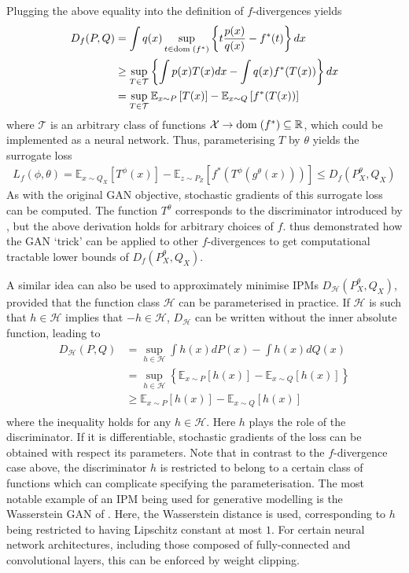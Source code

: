 Plugging the above equality into the definition of $f$-divergences yields
%
\begin{align*}
D_f(P, Q) &= \int q(x) \sup_{t \in {\bf{\rm dom}}\;(f^*)} \left\{t \frac{p(x)}{q(x)} - f^*(t) \right\} dx \\
& \geq \sup_{T \in \mathcal{T}} \left\{ \int p(x) T(x) dx - \int q(x) f^*(T(x)) \right\} dx \\
&= \sup_{T \in \mathcal{T}} \mathbb{E}_{x \sim P} \left[ T(x) \right] - \mathbb{E}_{x \sim Q} \left[ f^*(T(x)) \right] 
\end{align*}
%
where $\mathcal{T}$ is an arbitrary class of functions $\mathcal{X} \to {\bf{\rm dom}}\;(f^*) \subseteq \mathbb{R}$, which could be implemented as a neural network.
Thus, parameterising $T$ by $\theta$ yields the surrogate loss
%
\begin{align*}
L_f(\phi, \theta) = \mathbb{E}_{x \sim Q_X} \left[ T^\phi(x) \right] - \mathbb{E}_{z \sim P_Z} \left[ f^*(T^\phi(g^\theta(x))) \right] \leq D_f(P^\theta_X, Q_X)
\end{align*}
%
As with the original GAN objective, stochastic gradients of this surrogate loss can be computed. 
The function $T^\theta$ corresponds to the discriminator introduced by \cite{goodfellow}, but the above derivation holds for arbitrary choices of $f$. 
\cite{nowozin et al} thus demonstrated how the GAN `trick' can be applied to other $f$-divergences to get computational tractable lower bounds of $D_f(P^\theta_X, Q_X)$.

A similar idea can also be used to approximately minimise IPMs $D_\mathcal{H}(P^\theta_X, Q_X)$, provided that the function class $\mathcal{H}$ can be parameterised in practice.
If $\mathcal{H}$ is such that $h \in \mathcal{H}$ implies that $-h \in \mathcal{H}$, $D_\mathcal{H}$ can be written without the inner absolute function, leading to
%
\begin{align*}
D_{\mathcal{H}}(P, Q) &= \sup_{h\in\mathcal{H}} \int h(x) dP(x) - \int h(x) dQ(x) \\
&= \sup_{h\in\mathcal{H}} \left\{ \mathbb{E}_{x \sim P} \left[ h(x) \right]- \mathbb{E}_{x \sim Q} \left[ h(x) \right] \right\} \\
&\geq  \mathbb{E}_{x \sim P} \left[ h(x) \right]- \mathbb{E}_{x \sim Q} \left[ h(x) \right] \\
\end{align*}
%
where the inequality holds for any $h \in \mathcal{H}$. 
Here $h$ plays the role of the discriminator. 
If it is differentiable, stochastic gradients of the loss can be obtained with respect its parameters.
Note that in contrast to the $f$-divergence case above, the discriminator $h$ is restricted to belong to a certain class of functions which can complicate specifying the parameterisation.
The most notable example of an IPM being used for generative modelling is the Wasserstein GAN of \cite{WGAN}. 
Here, the Wasserstein distance is used, corresponding to $h$ being restricted to having Lipschitz constant at most $1$. 
For certain neural network architectures, including those composed of fully-connected and convolutional layers, this can be enforced by weight clipping.

